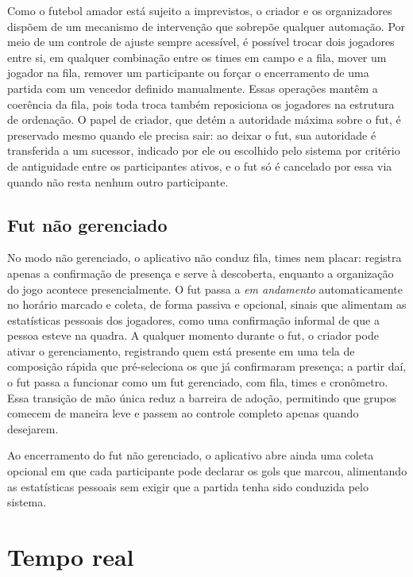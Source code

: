       Como o futebol amador está sujeito a imprevistos, o criador e os organizadores dispõem de um mecanismo de intervenção que sobrepõe qualquer automação. Por meio de um controle de ajuste sempre acessível, é possível trocar dois jogadores entre si, em qualquer combinação entre os times em campo e a fila, mover um jogador na fila, remover um participante ou forçar o encerramento de uma partida com um vencedor definido manualmente. Essas operações mantêm a coerência da fila, pois toda troca também reposiciona os jogadores na estrutura de ordenação. O papel de criador, que detém a autoridade máxima sobre o fut, é preservado mesmo quando ele precisa sair: ao deixar o fut, sua autoridade é transferida a um sucessor, indicado por ele ou escolhido pelo sistema por critério de antiguidade entre os participantes ativos, e o fut só é cancelado por essa via quando não resta nenhum outro participante.

    \subsection{Fut não gerenciado}
      \label{subsec:dev-nao-gerenciado}
      No modo não gerenciado, o aplicativo não conduz fila, times nem placar: registra apenas a confirmação de presença e serve à descoberta, enquanto a organização do jogo acontece presencialmente. O fut passa a \textit{em andamento} automaticamente no horário marcado e coleta, de forma passiva e opcional, sinais que alimentam as estatísticas pessoais dos jogadores, como uma confirmação informal de que a pessoa esteve na quadra. A qualquer momento durante o fut, o criador pode ativar o gerenciamento, registrando quem está presente em uma tela de composição rápida que pré-seleciona os que já confirmaram presença; a partir daí, o fut passa a funcionar como um fut gerenciado, com fila, times e cronômetro. Essa transição de mão única reduz a barreira de adoção, permitindo que grupos comecem de maneira leve e passem ao controle completo apenas quando desejarem.

      Ao encerramento do fut não gerenciado, o aplicativo abre ainda uma coleta opcional em que cada participante pode declarar os gols que marcou, alimentando as estatísticas pessoais sem exigir que a partida tenha sido conduzida pelo sistema.

\section{Tempo real}
  \label{sec:dev-tempo-real}

